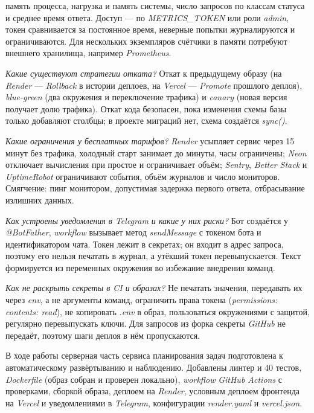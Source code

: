 \documentclass{stp}
\newcommand{\en}[1]{\textit{#1}}
\begin{document}
\begin{stpnum}
    память процесса, нагрузка и память системы, число запросов по классам
    статуса и среднее время ответа. Доступ --- по \en{METRICS\_TOKEN} или
    роли \en{admin}, токен сравнивается за постоянное время, неверные
    попытки журналируются и ограничиваются. Для нескольких экземпляров
    счётчики в памяти потребуют внешнего хранилища, например
    \en{Prometheus}.
  \item \textit{Какие существуют стратегии отката?} Откат к предыдущему
    образу (на \en{Render} --- \en{Rollback} в истории деплоев, на
    \en{Vercel} --- \en{Promote} прошлого деплоя), \en{blue-green}
    (два окружения и переключение трафика) и \en{canary} (новая версия
    получает долю трафика). Откат кода безопасен, пока изменения схемы базы
    только добавляют столбцы; в проекте миграций нет, схема создаётся
    \en{sync()}.
  \item \textit{Какие ограничения у бесплатных тарифов?} \en{Render} усыпляет
    сервис через 15 минут без трафика, холодный старт занимает до минуты, часы
    ограничены; \en{Neon} отключает вычисления при простое и ограничивает
    объём; \en{Sentry}, \en{Better Stack} и \en{UptimeRobot} ограничивают
    события, объём журналов и число мониторов. Смягчение: пинг монитором,
    допустимая задержка первого ответа, отбрасывание излишних данных.
  \item \textit{Как устроены уведомления в \en{Telegram} и какие у них
    риски?} Бот создаётся у \en{@BotFather}, \en{workflow} вызывает метод
    \en{sendMessage} с токеном бота и идентификатором чата. Токен лежит в
    секретах; он входит в адрес запроса, поэтому его нельзя печатать в
    журнал, а утёкший токен перевыпускается. Текст формируется из переменных
    окружения во избежание внедрения команд.
  \item \textit{Как не раскрыть секреты в \en{CI} и образах?} Не печатать
    значения, передавать их через \en{env}, а не аргументы команд, ограничить
    права токена (\en{permissions: contents: read}), не копировать \en{.env} в
    образ, пользоваться окружениями с защитой, регулярно перевыпускать
    ключи. Для запросов из форка секреты \en{GitHub} не передаёт, поэтому
    шаги деплоя в нём пропускаются.
\end{stpnum}


В ходе работы серверная часть сервиса планирования задач подготовлена к
автоматическому развёртыванию и наблюдению. Добавлены линтер и 40 тестов,
\en{Dockerfile} (образ собран и проверен локально), \en{workflow}
\en{GitHub Actions} с проверками, сборкой образа, деплоем на \en{Render},
условным деплоем фронтенда на \en{Vercel} и уведомлениями в \en{Telegram},
конфигурации \en{render.yaml} и \en{vercel.json}.
\end{document}
